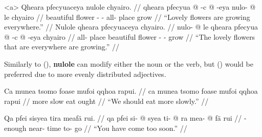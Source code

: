 \documentclass{article}
\begin{document}
\pex[lingstyle=QuCheanya,tag=flowers] 
\a<a> \begingl
\glpreamble Qheara pfecyuaceya nulole chyairo. //
\gla qheara pfecyua @ -c @ -eya nulo- @ le chyairo //
\glb beautiful flower - - all- place grow //
\glft ``Lovely flowers are growing everywhere.'' //
\endgl
\a \begingl
\glpreamble Nulole qheara pfecyuaceya chyairo. //
\gla nulo- @ le qheara pfecyua @ -c @ -eya chyairo //
\glb all- place beautiful flower - - grow //
\glft ``The lovely flowers that are everywhere are growing.'' //
\endgl
\xe

Similarly to (), \textbf{nulole} can modify either the noun or the verb, but () would be preferred due to more evenly distributed adjectives.

\ex[lingstyle=QuCheanya] \begingl
\glpreamble Ca munea tsomo foase mufoi qqhoa rapui. //
\gla ca munea tsomo foase mufoi qqhoa rapui //
\glb {}  more slow eat  ought //
\glft ``We should eat more slowly.'' //
\endgl \xe

\ex[lingstyle=QuCheanya] \begingl
\glpreamble Qa pfei sisyea tira meaf\"a rui. //
\gla qa pfei si- @ syea ti- @ ra mea- @ f\"a rui //
\glb {}  - enough near- time to- go  //
\glft ``You have come too soon.'' //
\endgl \xe
\end{document}
